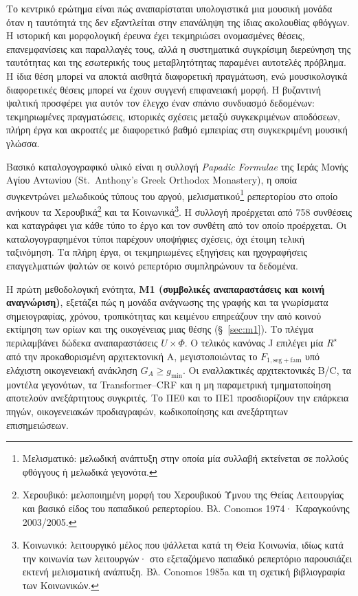 \documentclass[11pt,a4paper]{article}
\begin{document}
Το κεντρικό ερώτημα είναι πώς αναπαρίσταται υπολογιστικά μια μουσική μονάδα όταν η ταυτότητά της δεν εξαντλείται στην επανάληψη της ίδιας ακολουθίας φθόγγων. Η ιστορική και μορφολογική έρευνα έχει τεκμηριώσει ονομασμένες θέσεις, επανεμφανίσεις και παραλλαγές τους, αλλά η συστηματικά συγκρίσιμη διερεύνηση της ταυτότητας και της εσωτερικής τους μεταβλητότητας παραμένει αυτοτελές πρόβλημα. Η ίδια θέση μπορεί να αποκτά αισθητά διαφορετική πραγμάτωση, ενώ μουσικολογικά διαφορετικές θέσεις μπορεί να έχουν συγγενή επιφανειακή μορφή. Η βυζαντινή ψαλτική προσφέρει για αυτόν τον έλεγχο έναν σπάνιο συνδυασμό δεδομένων: τεκμηριωμένες πραγματώσεις, ιστορικές σχέσεις μεταξύ συγκεκριμένων αποδόσεων, πλήρη έργα και ακροατές με διαφορετικό βαθμό εμπειρίας στη συγκεκριμένη μουσική γλώσσα.

Βασικό καταλογογραφικό υλικό είναι η συλλογή \emph{Papadic Formulae} της Ιεράς Μονής Αγίου Αντωνίου (St.~Anthony's Greek Orthodox Monastery), η οποία συγκεντρώνει μελωδικούς τύπους του αργού, μελισματικού\footnote{Μελισματικό: μελωδική ανάπτυξη στην οποία μία συλλαβή εκτείνεται σε πολλούς φθόγγους ή μελωδικά γεγονότα.} ρεπερτορίου στο οποίο ανήκουν τα Χερουβικά\footnote{Χερουβικό: μελοποιημένη μορφή του Χερουβικού Ύμνου της Θείας Λειτουργίας και βασικό είδος του παπαδικού ρεπερτορίου. Βλ. Conomos 1974· Καραγκούνης 2003/2005.} και τα Κοινωνικά\footnote{Κοινωνικό: λειτουργικό μέλος που ψάλλεται κατά τη Θεία Κοινωνία, ιδίως κατά την κοινωνία των λειτουργών· στο εξεταζόμενο παπαδικό ρεπερτόριο παρουσιάζει εκτενή μελισματική ανάπτυξη. Βλ. Conomos 1985a και τη σχετική βιβλιογραφία των Κοινωνικών.}. Η συλλογή προέρχεται από 758 συνθέσεις και καταγράφει για κάθε τύπο το έργο και τον συνθέτη από τον οποίο προέρχεται. Οι καταλογογραφημένοι τύποι παρέχουν υποψήφιες σχέσεις, όχι έτοιμη τελική ταξινόμηση. Τα πλήρη έργα, οι τεκμηριωμένες εξηγήσεις και ηχογραφήσεις επαγγελματιών ψαλτών σε κοινό ρεπερτόριο συμπληρώνουν τα δεδομένα.

Η πρώτη μεθοδολογική ενότητα, \textbf{Μ1 (συμβολικές αναπαραστάσεις και κοινή αναγνώριση)}, εξετάζει πώς η μονάδα ανάγνωσης της γραφής και τα γνωρίσματα σημειογραφίας, χρόνου, τροπικότητας και κειμένου επηρεάζουν την από κοινού εκτίμηση των ορίων και της οικογένειας μιας θέσης (§~\ref{sec:m1}). Το πλέγμα περιλαμβάνει δώδεκα αναπαραστάσεις $U\times\Phi$. Ο τελικός κανόνας J επιλέγει μία $R^\star$ από την προκαθορισμένη αρχιτεκτονική A, μεγιστοποιώντας το $F_{1,\mathrm{seg+fam}}$ υπό ελάχιστη οικογενειακή ανάκληση $G_A\geq g_{\min}$. Οι εναλλακτικές αρχιτεκτονικές B/C, τα μοντέλα γεγονότων, τα Transformer--CRF και η μη παραμετρική τμηματοποίηση αποτελούν ανεξάρτητους συγκριτές. Το ΠΕ0 και το ΠΕ1 προσδιορίζουν την επάρκεια πηγών, οικογενειακών προδιαγραφών, κωδικοποίησης και ανεξάρτητων επισημειώσεων.
\end{document}
